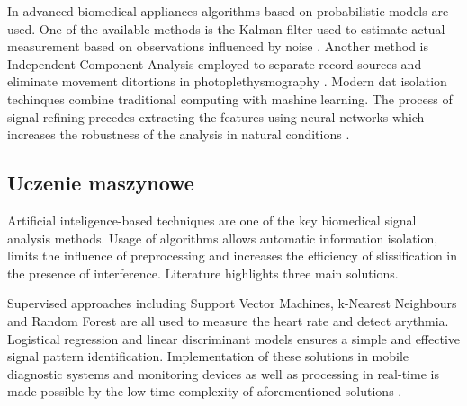 \documentclass[journal]{IEEEtran}
\begin{document}
{In advanced biomedical appliances algorithms based on probabilistic models are used. One of the available methods is the Kalman filter used to estimate actual measurement based on observations influenced by noise \cite{8}. Another method is Independent Component Analysis employed to separate record sources and eliminate movement ditortions in photoplethysmography  \cite{9}. Modern dat isolation techinques combine traditional computing with mashine learning. The process of signal refining precedes extracting the features using neural networks which increases the robustness of the analysis in natural conditions \cite{10}.

\subsection{Uczenie maszynowe}
Artificial inteligence-based techniques are one of the key biomedical signal analysis methods. Usage of algorithms allows automatic information isolation, limits the influence of preprocessing and increases the efficiency of slissification in the presence of interference. Literature highlights three main solutions.

Supervised approaches including Support Vector Machines, k-Nearest Neighbours and Random Forest are all used to measure the heart rate and detect arythmia. Logistical regression and linear discriminant models ensures a simple and effective signal pattern identification.
Implementation of these solutions in mobile diagnostic systems and monitoring devices as well as processing in real-time is made possible by the low time complexity of aforementioned solutions \cite{11}.

}
\end{document}
